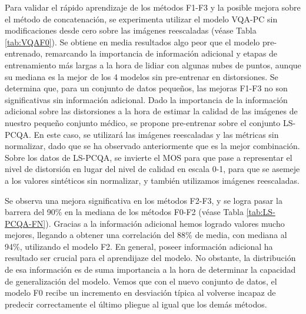Para validar el rápido aprendizaje de los métodos F1-F3 y la posible mejora 
sobre el método de concatenación, se experimenta utilizar el modelo VQA-PC sin 
modificaciones desde cero sobre las imágenes reescaladas (véase Tabla \ref{tab:VQAF0}).
Se obtiene en media resultados algo peor que el modelo 
pre-entrenado, remarcando la importancia de información adicional y etapas 
de entrenamiento más largas a la hora de lidiar con algunas nubes de puntos, aunque su
mediana es la mejor de los 4 modelos sin pre-entrenar en distorsiones. 
Se determina que, para un conjunto de datos pequeños, las mejoras F1-F3 no son significativas sin información adicional. 
Dado la importancia de la información adicional sobre las distorsiones a la 
hora de estimar la calidad de las imágenes de nuestro pequeño conjunto médico, 
se propone pre-entrenar sobre el conjunto LS-PCQA.
En este caso, se utilizará las imágenes reescaladas y las métricas sin normalizar, 
dado que se ha observado anteriormente que es la mejor combinación. Sobre los 
datos de LS-PCQA, se invierte el MOS para que pase a representar el nivel 
de distorsión en lugar del nivel de calidad en escala 0-1, para que se asemeje a los 
valores sintéticos sin normalizar, y también utilizamos imágenes reescaladas.

Se observa una mejora significativa en los métodos F2-F3, y se logra 
pasar la barrera del 90\% en la mediana de los métodos F0-F2 (véase Tabla \ref{tab:LS-PCQA-FN}).
Gracias a la información adicional hemos logrado valores mucho mejores, llegando a 
obtener una correlación del 88\% de media, con mediana al 94\%, utilizando el modelo F2. 
En general, poseer información adicional ha resultado ser crucial para el aprendijaze 
del modelo. No obstante, la distribución de esa información es de suma importancia a la 
hora de determinar la capacidad de generalización del modelo. Vemos que con el nuevo 
conjunto de datos, el modelo F0 recibe un incremento en desviación típica al
volverse incapaz de predecir correctamente el último pliegue al igual que los demás métodos.  

